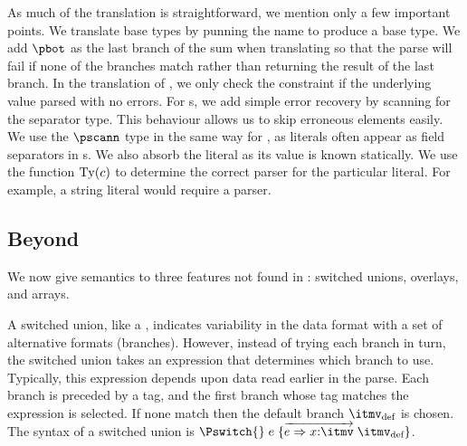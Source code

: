 As much of the translation is straightforward, we mention only a few
important points. We translate base types by punning the \ipads{} name
to produce a \ddc{} base type. We add $\pbot$ as the last branch of the
\ddc{} sum when translating \Punion{} so that the parse will fail if none of the branches match rather than
returning the result of the last branch. 
 In the translation of
\Pwhere{}, we only check the constraint
if the underlying value parsed with no errors. For \Parray{}s, we add
simple error recovery by scanning for the separator type.  This
behaviour allows us to skip erroneous elements easily. We use the
$\pscann$ type in the same way for , as literals often
appear as field separators in \Pstruct{}s.  We also absorb the literal
as its value is known statically.  We use the function ${\rm Ty}(c)$
to determine the correct parser for the particular literal. For
example, a string literal would require a \Pstring{} parser.

\subsection{Beyond \ipads{}}

We now give semantics to three features not found in \ipads{}:
\pads{} switched unions, \packettypes{} overlays, and \datascript{} arrays.

A switched union, like a \Punion, indicates variability in the data
format with a set of alternative formats (branches). However, instead
of trying each branch in turn, the switched union takes an expression that
determines which branch to use. Typically, this expression depends upon data read earlier in the parse. Each branch is preceded by a tag,
and the first branch whose tag matches the expression is selected.
If none match then the default branch $\itmv_{\text{def}}$ is chosen.
The syntax of a switched union is $\Pswitch{}\;e\;\{\overrightarrow{e
  \Rightarrow x{:}\itmv}\; \itmv_{\text{def}}\}$.

